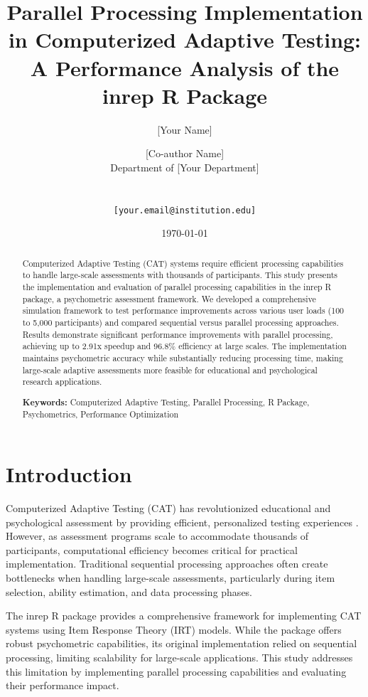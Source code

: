 \documentclass[11pt]{article}
\title{Parallel Processing Implementation in Computerized Adaptive Testing: A Performance Analysis of the inrep R Package}
\author{[Your Name] \and [Co-author Name] \\
Department of [Your Department] \\
[Your Institution] \\
[Your City, State ZIP] \\
\texttt{[your.email@institution.edu]}}
\date{\today}
\begin{document}
\maketitle

\begin{abstract}
Computerized Adaptive Testing (CAT) systems require efficient processing capabilities to handle large-scale assessments with thousands of participants. This study presents the implementation and evaluation of parallel processing capabilities in the inrep R package, a psychometric assessment framework. We developed a comprehensive simulation framework to test performance improvements across various user loads (100 to 5,000 participants) and compared sequential versus parallel processing approaches. Results demonstrate significant performance improvements with parallel processing, achieving up to 2.91x speedup and 96.8\% efficiency at large scales. The implementation maintains psychometric accuracy while substantially reducing processing time, making large-scale adaptive assessments more feasible for educational and psychological research applications.

\textbf{Keywords:} Computerized Adaptive Testing, Parallel Processing, R Package, Psychometrics, Performance Optimization
\end{abstract}

\section{Introduction}

Computerized Adaptive Testing (CAT) has revolutionized educational and psychological assessment by providing efficient, personalized testing experiences \cite{wainer2000, vanderlinden2010}. However, as assessment programs scale to accommodate thousands of participants, computational efficiency becomes critical for practical implementation. Traditional sequential processing approaches often create bottlenecks when handling large-scale assessments, particularly during item selection, ability estimation, and data processing phases.

The inrep R package provides a comprehensive framework for implementing CAT systems using Item Response Theory (IRT) models. While the package offers robust psychometric capabilities, its original implementation relied on sequential processing, limiting scalability for large-scale applications. This study addresses this limitation by implementing parallel processing capabilities and evaluating their performance impact.
\end{document}
